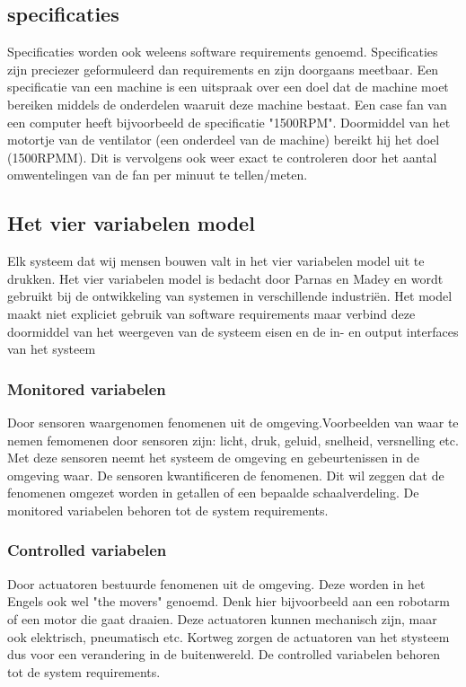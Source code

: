 \documentclass{article}
\begin{document}
\subsection{specificaties}
Specificaties worden ook weleens software requirements genoemd. Specificaties zijn preciezer geformuleerd dan requirements en zijn doorgaans meetbaar. Een specificatie van een machine is een uitspraak over een doel dat de machine moet bereiken middels de onderdelen waaruit deze machine bestaat. Een case fan van een computer heeft bijvoorbeeld de specificatie "1500RPM". Doormiddel van het motortje van de ventilator (een onderdeel van de machine) bereikt hij het doel (1500RPMM). Dit is vervolgens ook weer exact te controleren door het aantal omwentelingen van de fan per minuut te tellen/meten.

\subsection{Het vier variabelen model}
Elk systeem dat wij mensen bouwen valt in het vier variabelen model uit te drukken. Het vier variabelen model is bedacht door Parnas en Madey en wordt gebruikt bij de ontwikkeling van systemen in verschillende industriën. Het model maakt niet expliciet gebruik van software requirements maar verbind deze doormiddel van het weergeven van de systeem eisen en de in- en output interfaces van het systeem~\cite{electroniccommunications} 

\subsubsection{Monitored variabelen}
Door sensoren waargenomen fenomenen uit de omgeving.Voorbeelden van waar te nemen femomenen door sensoren zijn: licht, druk, geluid, snelheid, versnelling etc. Met deze sensoren neemt het systeem de omgeving en gebeurtenissen in de omgeving waar. De sensoren kwantificeren de fenomenen. Dit wil zeggen dat de fenomenen omgezet worden in getallen of een bepaalde schaalverdeling. De monitored variabelen behoren tot de system requirements.

\subsubsection{Controlled variabelen}
Door actuatoren bestuurde fenomenen uit de omgeving. Deze worden in het Engels ook wel "the movers" genoemd. Denk hier bijvoorbeeld aan een robotarm of een motor die gaat draaien. Deze actuatoren kunnen mechanisch zijn, maar ook elektrisch, pneumatisch etc. Kortweg zorgen de actuatoren van het stysteem dus voor een verandering in de buitenwereld. De controlled variabelen behoren tot de system requirements.
\end{document}
